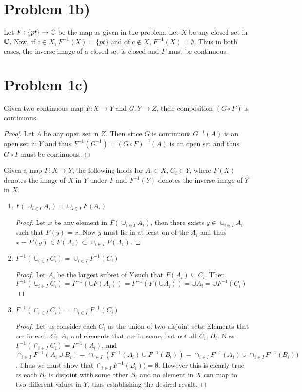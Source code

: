 \section*{Problem 1b)}
Let $F:\{pt\}\to \mathbb{C}$ be the map as given in the problem. Let $X$ be any closed set in $\mathbb{C}$. Now, if $c\in X$, $F^{-1}(X) = \{pt\}$ and of $c \notin X$, $F^{-1}(X) = \emptyset$. Thus in both cases, the inverse image of a closed set is closed and $F$ must be continuous.
\section*{Problem 1c)}
\begin{lemma}
Given two continuous map $F: X\to Y$ and $G: Y\to Z$, their composition $(G\circ F)$ is continuous. 
\begin{proof}
Let $A$ be any open set in $Z$. Then since $G$ is continuous $G^{-1}(A)$ is an open set in $Y$ and thus $F^{-1}(G^{-1}) = (G \circ F)^{-1}(A)$ is an open set and thus $G\circ F$ must be continuous. 
\end{proof}
\end{lemma}
\begin{lemma}
Given a map $F: X\to Y$, the following holds for $A_i\in X$, $C_i \in Y$, where $F(X)$ denotes the image of $X$ in $Y$ under $F$ and $F^{-1}(Y)$ denotes the inverse image of $Y$ in $X$.
\begin{enumerate}
\item $F(\cup_{i\in I} A_i) = \cup_{i\in I} F(A_i)$
\begin{proof}
Let $x$ be any element in $F(\cup_{i\in I} A_i)$, then there exists  $y\in \cup_{i\in I} A_i$ such that $F(y) = x$. Now $y$ must lie in at least on of the $A_i$ and thus  $x=F(y)\in F(A_i) \subset  \cup_{i\in I} F(A_i)$.
\end{proof}
\item $F^{-1}(\cup_{i\in I} C_i) = \cup_{i\in I} F^{-1}(C_i)$
\begin{proof}
Let $A_i$ be the largest subset of $Y$ such that $F(A_i)\subseteq C_i$. Then $F^{-1}(\cup_{i\in I} C_i) = F^{-1}(\cup F(A_i)) = F^{-1}(F(\cup A_i)) = \cup A_i = \cup F^{-1}(C_i)$
\end{proof}
\item $F^{-1}(\cap_{i\in I} C_i) = \cap_{i\in I}  F^{-1}(C_i)$
\begin{proof}
Let us consider each $C_i$ as the union of two disjoint sets: Elements that are in each $C_i$, $A_i$ and elements that are in some, but not all $C_i$, $B_i$.
Now $F^{-1}(\cap_{i\in I} C_i) = F^{-1}(A_i)$, and $\cap_{i\in I}  F^{-1}(A_i\cup B_i) = \cap_{i\in I}  (F^{-1}(A_i) \cup F^{-1}(B_i)) =    \cap_{i\in I} F^{-1}(A_i) \cup  \cap_{i\in I} F^{-1}(B_i))$. Thus we must show that $\cap_{i\in I} F^{-1}(B_i)) = \emptyset$. However this is clearly true as each $B_i$ is disjoint with some other $B_i$ and no element in $X$ can map to two different values in $Y$, thus establishing the desired result. 
\end{proof}
\end{enumerate}
\end{lemma}
